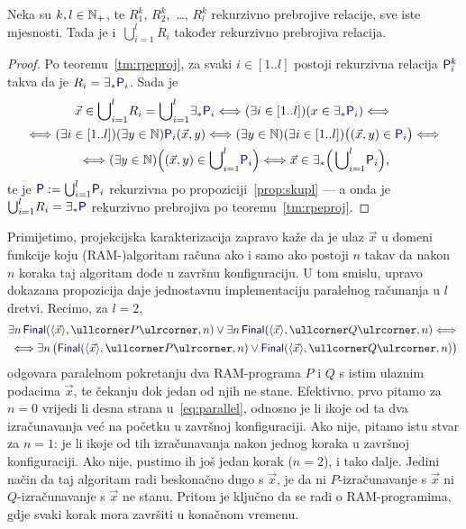 \begin{propozicija}[{name=[rekurzivna prebrojivost unije rekurzivno prebrojivih relacija]}]\label{pp:unlre}
Neka su $k,l\in{\mathbb N}_+$, te $R_1^k$, $R_2^k$,~\ldots, $R_l^k$ rekurzivno prebrojive relacije, sve iste mjesnosti. Tada je i\, $\bigcup_{i=1}^l\! R_i$ također rekurzivno prebrojiva relacija.
\end{propozicija}
\begin{proof}
Po teoremu~\ref{tm:rpeproj}, za svaki $i\in[1..l]$ postoji rekurzivna relacija $\f P^k_i$ takva da je $R_i=\exists_*\f P_i$. Sada je
\begin{multline}\label{eq:urere}
    \vec x\in\bigcup\nolimits_{i=1}^l\! R_i=\bigcup\nolimits_{i=1}^l\!\exists_*\f P_i\Longleftrightarrow
    (\exists i\in[1..l])(x\in\exists_*\f P_i)\Longleftrightarrow{}\\
    {}\Longleftrightarrow(\exists i\in[1..l])(\exists y\in\N)\f P_i(\vec x,y)\Longleftrightarrow(\exists y\in\N)(\exists i\in[1..l])\bigl((\vec x,y)\in\f P_i\bigr)\Longleftrightarrow{}\\
    {}\Longleftrightarrow
    (\exists y\in\N)\Bigl((\vec x,y)\in\bigcup\nolimits_{i=1}^l\!\f P_i\Bigr)\Longleftrightarrow\vec x\in\exists_*\Bigl(\,\bigcup\nolimits_{i=1}^l\!\f P_i\Bigr)\text,
\end{multline}
te je $\f P:=\bigcup_{i=1}^l\!\f P_i$ rekurzivna po propoziciji~\ref{prop:skupl} --- a onda je $\bigcup_{i=1}^l\! R_i=\exists_*\f P$ rekurzivno prebrojiva po teoremu~\ref{tm:rpeproj}.
\end{proof}

Primijetimo, projekcijska karakterizacija zapravo kaže da je ulaz $\vec x$ u domeni funkcije koju (RAM-\!)algoritam računa ako i samo ako postoji $n$ takav da nakon $n$ koraka taj algoritam dođe u završnu konfiguraciju. U tom smislu, upravo dokazana propozicija daje jednostavnu implementaciju paralelnog računanja u $l$ dretvi. Recimo, za $l=2$,
\begin{multline}\label{eq:parallel}
    \exists n\,\f{Final}(\kr{\vec x},\kprog P,n)\lor\exists n\,\f{Final}(\kr{\vec x},\kprog Q,n)\Longleftrightarrow{}\\
    {}\Longleftrightarrow\exists n\,\bigl(\f{Final}(\kr{\vec x},\kprog P,n)\lor\f{Final}(\kr{\vec x},\kprog Q,n)\bigr)
\end{multline}
odgovara paralelnom pokretanju dva RAM-programa $P$ i $Q$ s istim ulaznim podacima $\vec x$, te čekanju dok jedan od njih ne stane. Efektivno, prvo pitamo za $n=0$ vrijedi li desna strana u~\eqref{eq:parallel}, odnosno je li ikoje od ta dva izračunavanja već na početku u završnoj konfiguraciji. Ako nije, pitamo istu stvar za $n=1$: je li ikoje od tih izračunavanja nakon jednog koraka u završnoj konfiguraciji. Ako nije, pustimo ih još jedan korak ($n=2$), i tako dalje. Jedini način da taj algoritam radi beskonačno dugo s $\vec x$, je da ni $P$-izračunavanje s $\vec x$ ni $Q$-izračunavanje s $\vec x$ ne stanu. Pritom je ključno da se radi o RAM-programima, gdje svaki korak mora završiti u konačnom vremenu.

